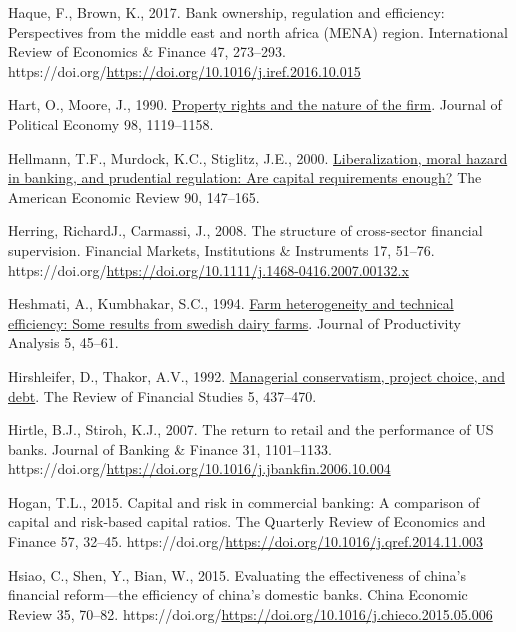 \documentclass[
  letterpaper,
  DIV=11,
  numbers=noendperiod]{scrreprt}
\newlength{\cslhangindent}
\newenvironment{CSLReferences}[2] %
 {\begin{list}{}{%
  \setlength{\itemindent}{0pt}
  \setlength{\leftmargin}{0pt}
  \setlength{\parsep}{0pt}
  \ifodd #1
   \setlength{\leftmargin}{\cslhangindent}
   \setlength{\itemindent}{-1\cslhangindent}
  \fi
  \setlength{\itemsep}{#2\baselineskip}}}
 {\end{list}}
\begin{document}
\begin{CSLReferences}{1}{0}
Haque, F., Brown, K., 2017. Bank ownership, regulation and efficiency:
Perspectives from the middle east and north africa (MENA) region.
International Review of Economics \& Finance 47, 273--293.
https://doi.org/\url{https://doi.org/10.1016/j.iref.2016.10.015}

Hart, O., Moore, J., 1990.
\href{http://www.jstor.org/stable/2937753}{Property rights and the
nature of the firm}. Journal of Political Economy 98, 1119--1158.

Hellmann, T.F., Murdock, K.C., Stiglitz, J.E., 2000.
\href{http://www.jstor.org.queens.ezp1.qub.ac.uk/stable/117285}{Liberalization,
moral hazard in banking, and prudential regulation: Are capital
requirements enough?} The American Economic Review 90, 147--165.

Herring, RichardJ., Carmassi, J., 2008. The structure of cross-sector
financial supervision. Financial Markets, Institutions \& Instruments
17, 51--76.
https://doi.org/\url{https://doi.org/10.1111/j.1468-0416.2007.00132.x}

Heshmati, A., Kumbhakar, S.C., 1994.
\href{http://www.jstor.org/stable/41769891}{Farm heterogeneity and
technical efficiency: Some results from swedish dairy farms}. Journal of
Productivity Analysis 5, 45--61.

Hirshleifer, D., Thakor, A.V., 1992.
\href{http://www.jstor.org.queens.ezp1.qub.ac.uk/stable/2962134}{Managerial
conservatism, project choice, and debt}. The Review of Financial Studies
5, 437--470.

Hirtle, B.J., Stiroh, K.J., 2007. The return to retail and the
performance of US banks. Journal of Banking \& Finance 31, 1101--1133.
https://doi.org/\url{https://doi.org/10.1016/j.jbankfin.2006.10.004}

Hogan, T.L., 2015. Capital and risk in commercial banking: A comparison
of capital and risk-based capital ratios. The Quarterly Review of
Economics and Finance 57, 32--45.
https://doi.org/\url{https://doi.org/10.1016/j.qref.2014.11.003}

Hsiao, C., Shen, Y., Bian, W., 2015. Evaluating the effectiveness of
china's financial reform---the efficiency of china's domestic banks.
China Economic Review 35, 70--82.
https://doi.org/\url{https://doi.org/10.1016/j.chieco.2015.05.006}


\end{CSLReferences}
\end{document}
